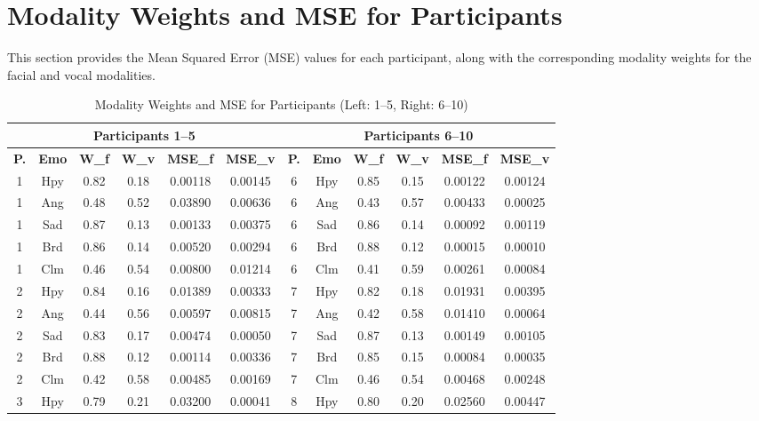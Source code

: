 \section*{Modality Weights and MSE for Participants }
\label{app:modality-mse}

This section provides the Mean Squared Error (MSE) values for each participant, along with the corresponding modality weights for the facial and vocal modalities. 

\begin{table}[H]
    \centering
    \caption{Modality Weights and MSE for Participants (Left: 1–5, Right: 6–10)}
    \label{tab:modality-mse}
    \begin{tabular}{|c|c|c|c|c|c||c|c|c|c|c|c|}
    \hline
    \multicolumn{6}{|c||}{\textbf{Participants 1–5}} & \multicolumn{6}{c|}{\textbf{Participants 6–10}} \\
    \hline
    \textbf{P.} & \textbf{Emo} & \textbf{W\_f} & \textbf{W\_v} & \textbf{MSE\_f} & \textbf{MSE\_v} & \textbf{P.} & \textbf{Emo} & \textbf{W\_f} & \textbf{W\_v} & \textbf{MSE\_f} & \textbf{MSE\_v} \\
    \hline
    1 & Hpy & 0.82 & 0.18 & 0.00118 & 0.00145 & 6 & Hpy & 0.85 & 0.15 & 0.00122 & 0.00124 \\
    1 & Ang & 0.48 & 0.52 & 0.03890 & 0.00636 & 6 & Ang & 0.43 & 0.57 & 0.00433 & 0.00025 \\
    1 & Sad & 0.87 & 0.13 & 0.00133 & 0.00375 & 6 & Sad & 0.86 & 0.14 & 0.00092 & 0.00119 \\
    1 & Brd & 0.86 & 0.14 & 0.00520 & 0.00294 & 6 & Brd & 0.88 & 0.12 & 0.00015 & 0.00010 \\
    1 & Clm & 0.46 & 0.54 & 0.00800 & 0.01214 & 6 & Clm & 0.41 & 0.59 & 0.00261 & 0.00084 \\
    \hline
    2 & Hpy & 0.84 & 0.16 & 0.01389 & 0.00333 & 7 & Hpy & 0.82 & 0.18 & 0.01931 & 0.00395 \\
    2 & Ang & 0.44 & 0.56 & 0.00597 & 0.00815 & 7 & Ang & 0.42 & 0.58 & 0.01410 & 0.00064 \\
    2 & Sad & 0.83 & 0.17 & 0.00474 & 0.00050 & 7 & Sad & 0.87 & 0.13 & 0.00149 & 0.00105 \\
    2 & Brd & 0.88 & 0.12 & 0.00114 & 0.00336 & 7 & Brd & 0.85 & 0.15 & 0.00084 & 0.00035 \\
    2 & Clm & 0.42 & 0.58 & 0.00485 & 0.00169 & 7 & Clm & 0.46 & 0.54 & 0.00468 & 0.00248 \\
    \hline
    3 & Hpy & 0.79 & 0.21 & 0.03200 & 0.00041 & 8 & Hpy & 0.80 & 0.20 & 0.02560 & 0.00447 \\

\end{tabular}
\end{table}
